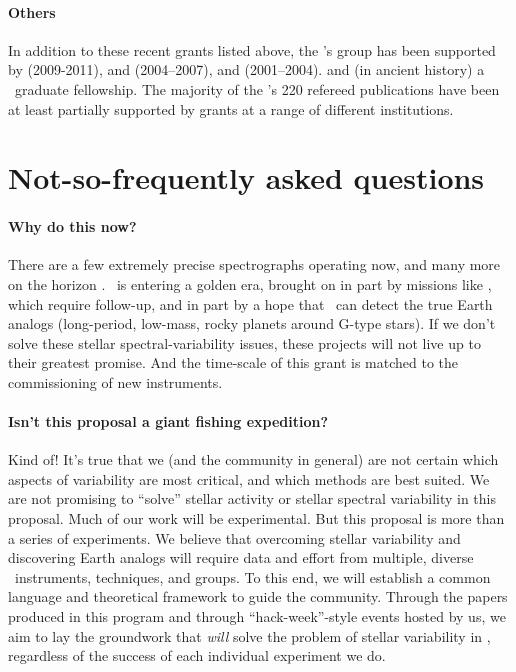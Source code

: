\documentclass[12pt, letterpaper]{article}
\begin{document}
\paragraph{Others}
In addition to these recent grants listed above, the \PI's group has been supported by
 (2009-2011),
and
 (2004--2007),
and
 (2001--2004).
and (in ancient history) a \NSF\ graduate fellowship.
The majority of the \PI's 220 refereed publications have been at least partially supported
by \NSF grants at a range of different institutions.

\section{Not-so-frequently asked questions}

\paragraph{Why do this now?}
There are a few extremely precise spectrographs operating now, 
and many more on the horizon \citep{Wright2017}.
\EPRV\ is entering a golden era, brought on in part by missions like
\TESS, which require follow-up, and in part by a hope that
\EPRV\ can detect the true Earth analogs (long-period, low-mass, rocky
planets around G-type stars).
If we don't solve these stellar spectral-variability issues, these
projects will not live up to their greatest promise.
And the time-scale of this grant is matched to the
commissioning of new instruments.

\paragraph{Isn't this proposal a giant fishing expedition?}
Kind of! It's true that we (and the community in general) are not certain 
which aspects of variability are most critical, and which 
methods are best suited. We are not promising to 
``solve'' stellar activity or stellar spectral variability in this proposal.
Much of our work will be 
experimental. But this proposal is more than a series of experiments. 
We believe that overcoming stellar variability and 
discovering Earth analogs will require data and effort from multiple, 
diverse \EPRV\ instruments, techniques, and groups. To this end, we will establish 
a common language and theoretical framework 
to guide the community. Through the papers produced in this 
program and through ``hack-week''-style events hosted by us, we aim to 
lay the groundwork that \textit{will} solve the problem of stellar variability 
in \EPRV, regardless of the success of each individual experiment we do. 
\end{document}
